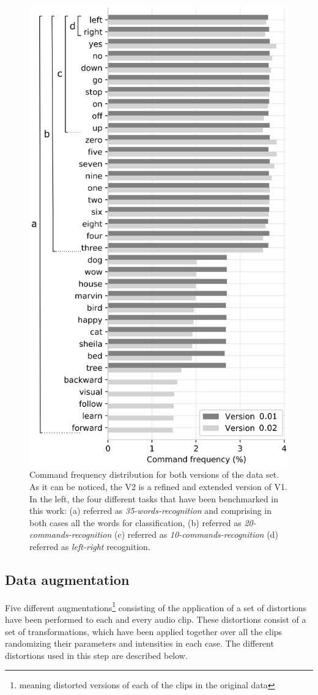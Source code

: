 \documentclass[review]{elsarticle}
\begin{document}
\begin{figure}[h!]
	\centering
	\includegraphics[width=0.45\linewidth]{img/freqdist_data}
	\caption{Command frequency distribution for both versions of the data set. As it can be noticed, the V2 is a refined and extended version of V1. In the left, the four different tasks that have been benchmarked in this work: (a) referred as \textit{35-words-recognition} and comprising in both cases all the words for classification, (b) referred as \textit{20-commands-recognition}  (c) referred as \textit{10-commands-recognition} (d) referred as \textit{left-right} recognition.}
	\label{fig:freqdistdata}
\end{figure}

\subsection{Data augmentation}
Five different augmentations\footnote{meaning distorted versions of each of the clips in the original data} consisting of the application of a set of distortions have been performed to each and every audio clip. These distortions consist of a set of transformations, which have been applied together over all the clips randomizing their parameters and intensities in each case. The different distortions used in this step are described below.
\end{document}
